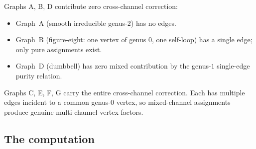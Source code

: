 \documentclass[11pt]{article}
\theoremstyle{definition}
\theoremstyle{remark}
\numberwithin{equation}{section}
\begin{document}
Graphs A, B, D contribute zero cross-channel correction:
\begin{itemize}
\item Graph~A (smooth irreducible genus-$2$) has no edges.
\item Graph~B (figure-eight: one vertex of genus $0$, one
 self-loop) has a single edge; only pure assignments exist.
\item Graph~D (dumbbell) has zero mixed contribution by the
 genus-$1$ single-edge purity relation.
\end{itemize}

Graphs C, E, F, G carry the entire cross-channel correction.
Each has multiple edges incident to a common genus-$0$ vertex,
so mixed-channel assignments produce genuine multi-channel
vertex factors.

\subsection{The computation}
\end{document}
